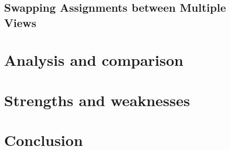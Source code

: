 \documentclass[12pt]{article}
\begin{document}
	\subsection*{Swapping Assignments between Multiple Views}
	
	
	
	\section{Analysis and comparison}
	
	
	
	\section{Strengths and weaknesses}
	
	
	\section{Conclusion}
	
	
	\newpage
	
	
	

	
	
	
\end{document}
